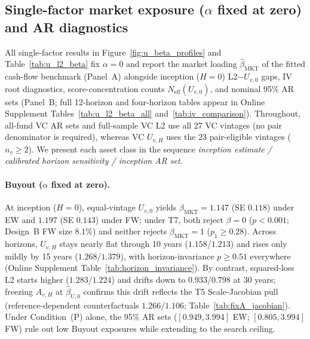 \documentclass[12pt]{article}
\begin{document}
\subsection{Single-factor market exposure ($\alpha$ fixed at zero) and AR diagnostics}
\label{sec:empirical_single_bovc}

All single-factor results in Figure~\ref{fig:u_beta_profiles} and Table~\ref{tab:u_l2_beta} fix $\alpha = 0$ and report the market loading $\hat\beta_{\mathrm{MKT}}$ of the fitted cash-flow benchmark (Panel~A) alongside inception ($H=0$) L2$-U_{v,0}$ gaps, IV root diagnostics, score-concentration counts $N_{\mathrm{eff}}(U_{v,0})$, and nominal 95\% AR sets (Panel~B; full 12-horizon and four-horizon tables appear in Online Supplement Tables~\ref{tab:u_l2_beta_all} and~\ref{tab:iv_comparison}).
Throughout, all-fund VC AR sets and full-sample VC L2 use all 27 VC vintages (no pair denominator is required), whereas VC $U_{v,H}$ uses the 23 pair-eligible vintages ($n_v \ge 2$).
We present each asset class in the sequence \emph{inception estimate / calibrated horizon sensitivity / inception AR set}.





\paragraph{Buyout ($\alpha$ fixed at zero).}
At inception ($H = 0$), equal-vintage $U_{v,0}$ yields $\hat\beta_{\mathrm{MKT}} = 1.147$ (SE $0.118$) under EW and $1.197$ (SE $0.143$) under FW; under T7, both reject $\beta = 0$ ($p < 0.001$; Design~B FW size $8.1\%$) and neither rejects $\beta_{\mathrm{MKT}} = 1$ ($p_1 \ge 0.28$).
Across horizons, $U_{v,H}$ stays nearly flat through 10 years ($1.158$/$1.213$) and rises only mildly by 15 years ($1.268$/$1.379$), with horizon-invariance $p \ge 0.51$ everywhere (Online Supplement Table~\ref{tab:horizon_invariance}).
By contrast, squared-loss L2 starts higher ($1.283$/$1.224$) and drifts down to $0.933$/$0.798$ at 30 years; freezing $A_{v,H}$ at $\hat\beta_{U,0}$ confirms this drift reflects the T5 Scale-Jacobian pull (reference-dependent counterfactuals $1.266$/$1.106$; Table~\ref{tab:fixA_jacobian}).
Under Condition~(P) alone, the 95\% AR sets ($[0.949, 3.994]$ EW; $[0.805, 3.994]$ FW) rule out low Buyout exposures while extending to the search ceiling.
\end{document}
